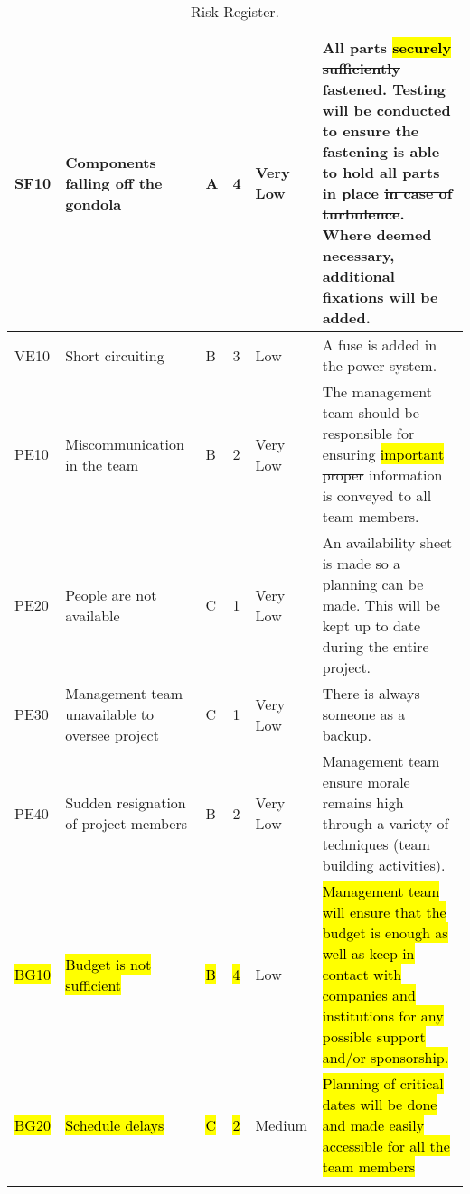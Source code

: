 \begin{longtable}{|m{}| m{} |m{} |m{}|m{}| m{}|}
SF10 & Components falling off the gondola									& A & 4 & \cellcolor[HTML]{34FF34}Very Low	& All parts \hl{securely} \st{sufficiently} fastened. Testing will be conducted to ensure the fastening is able to hold all parts in place \st{in case of turbulence}. Where deemed necessary, additional fixations will be added.\\\hline

VE10 & Short circuiting														& B & 3 & \cellcolor[HTML]{FCFF2F}Low			& A fuse is added in the power system.\\\hline

PE10 & Miscommunication in the team											& B & 2 & \cellcolor[HTML]{34FF34}Very Low	& The management team should be responsible for ensuring \hl{important} \st{proper} information is conveyed to all team members.\\\hline

PE20 & People are not available												& C & 1 & \cellcolor[HTML]{34FF34}Very Low	& An availability sheet is made so a planning can be made. This will be kept up to date during the entire project.\\\hline

PE30 & Management team unavailable to oversee project						& C & 1 & \cellcolor[HTML]{34FF34}Very Low	& There is always someone as a backup.\\\hline

PE40 & Sudden resignation of project members								& B & 2 & \cellcolor[HTML]{34FF34}Very Low	& Management team ensure morale remains high through a variety of techniques (team building activities).\\\hline

\hl{BG10} & \hl{Budget is not sufficient} & \hl{B} & \hl{4} & \cellcolor[HTML]{FCFF2F}Low & \hl{Management team will ensure that the budget is enough as well as keep in contact with companies and institutions for any possible support and/or sponsorship.} \\ \hline

\hl{BG20} & \hl{Schedule delays} & \hl{C} & \hl{2} & \cellcolor[HTML]{F39C12} Medium & \hl{Planning of critical dates will be done and made easily accessible for all the team members} \\ \hline



\caption{Risk Register.}
\label{tab:risk-register}
\end{longtable}
\raggedbottom